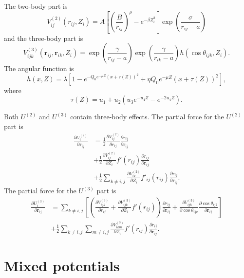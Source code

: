 \documentclass[12pt,a4paper]{report}
\newcommand{\vect}[1]{\boldsymbol{#1}}
\begin{document}
The two-body part is
\begin{equation}
V^{(2)}_{ij}(r_{ij},Z_i) =  A
\left[ \left( \frac{B }{ r_{ij} } \right)^{\rho}- e^{-\beta Z_i^2} \right]
\exp\left(   \frac{\sigma}{ r_{ij} - a} \right)
\end{equation}
and the three-body part is
\begin{equation}
V^{(3)}_{ijk}(\vect{r}_{ij}, \vect{r}_{ik}, Z_i) =
\exp\left(   \frac{\gamma}{ r_{ij} - a} \right)
\exp\left(   \frac{\gamma}{ r_{ik} - a} \right)
h \left(\cos \theta_{ijk} , Z_i \right).
\end{equation}
The angular function is
\begin{equation}
h \left(x , Z \right) =
\lambda \left[1 - e^{ -Q_0 e^{-\mu Z} (x + \tau(Z))^2}  + \eta Q_0 e^{-\mu Z} (x + \tau(Z))^2 \right],
\end{equation}
where
\begin{equation}
\tau(Z) = u_1 + u_2(u_3 e^{-u_4 Z} - e^{-2u_4 Z} ).
\end{equation}

Both $U^{(2)}$ and $U^{(3)}$ contain three-body effects. The partial force for the $U^{(2)}$ part is
\begin{align}
\frac{\partial U^{(2)}_i}{\partial \vect{r}_{ij}}
&= \frac{1}{2} \frac{\partial V^{(2)}_{ij}}{\partial r_{ij}} \frac{\partial r_{ij}}{\partial \vect{r}_{ij}} \nonumber \\
&+ \frac{1}{2} \frac{\partial V^{(2)}_{ij}}{\partial Z_{i}} f'(r_{ij}) \frac{\partial r_{ij}}{\partial \vect{r}_{ij}} \nonumber \\
&+ \frac{1}{2} \sum_{k\neq i,j} \frac{\partial V^{(2)}_{ik}}{\partial Z_{i}} f'_{ij}(r_{ij}) \frac{\partial r_{ij}}{\partial \vect{r}_{ij}}.
\end{align}
The partial force for the $U^{(3)}$ part is
\begin{align}
\frac{\partial U^{(3)}_i}{\partial \vect{r}_{ij}}
&= \sum_{k\neq i,j} 
\left[
\left( \frac{\partial V^{(3)}_{ijk}}{\partial r_{ij}} + \frac{\partial V^{(3)}_{ijk}}{\partial Z_{i}} f'(r_{ij} ) \right)
\frac{\partial r_{ij}}{\partial \vect{r}_{ij}}
+ \frac{\partial V^{(3)}_{ijk}}{\partial \cos\theta_{ijk}} \frac{\partial \cos\theta_{ijk}}{\partial \vect{r}_{ij}} 
\right]
 \nonumber \\
&+ \frac{1}{2} \sum_{k\neq i,j} \sum_{m\neq i,j} \frac{\partial V^{(3)}_{ikm}}{\partial Z_{i}} f'(r_{ij}) \frac{\partial r_{ij}}{\partial \vect{r}_{ij}}.
\end{align}

\section{Mixed potentials}
\end{document}
